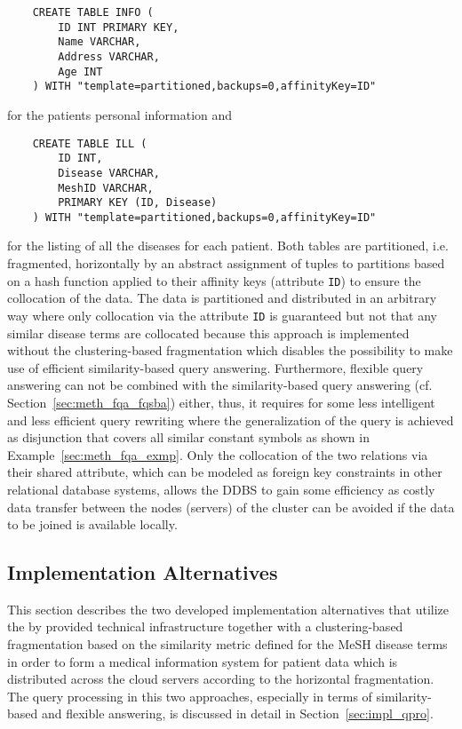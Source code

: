 \begin{verbatim}
    CREATE TABLE INFO (
        ID INT PRIMARY KEY,
        Name VARCHAR,
        Address VARCHAR,
        Age INT
    ) WITH "template=partitioned,backups=0,affinityKey=ID"
\end{verbatim}
for the patients personal information and
\begin{verbatim}
    CREATE TABLE ILL (
        ID INT,
        Disease VARCHAR,
        MeshID VARCHAR,
        PRIMARY KEY (ID, Disease)
    ) WITH "template=partitioned,backups=0,affinityKey=ID"
\end{verbatim}
for the listing of all the diseases for each patient. Both tables are partitioned, i.e. fragmented, horizontally by an abstract assignment of tuples to
partitions based on a hash function applied to their affinity keys (attribute \verb!ID!) to ensure the collocation of the data. The data is partitioned and 
distributed in an arbitrary way where only collocation via the attribute \verb!ID! is guaranteed but not that any similar disease terms are collocated because
this approach is implemented without the clustering-based fragmentation which disables the possibility to make use of efficient similarity-based query
answering. Furthermore, flexible query answering can not be combined with the similarity-based query answering (cf. Section~\ref{sec:meth_fqa_fqsba}) either,
thus, it requires for some less intelligent and less efficient query rewriting where the generalization of the query is achieved as disjunction that covers all
similar constant symbols as shown in Example~\ref{sec:meth_fqa_exmp}. Only the collocation of the two relations via their shared attribute, which can be 
modeled as foreign key constraints in other relational database systems, allows the DDBS to gain some efficiency as costly data transfer between the nodes
(servers) of the cluster can be avoided if the data to be joined is available locally.

\subsection{Implementation Alternatives}
\label{sec:impl_alter}

This section describes the two developed implementation alternatives that utilize the by  provided technical infrastructure together with a
clustering-based fragmentation based on the similarity metric defined for the MeSH disease terms in order to form a medical information system for patient data 
which is distributed across the cloud servers according to the horizontal fragmentation. The query processing in this two approaches, especially in terms of 
similarity-based and flexible answering, is discussed in detail in Section~\ref{sec:impl_qpro}.

